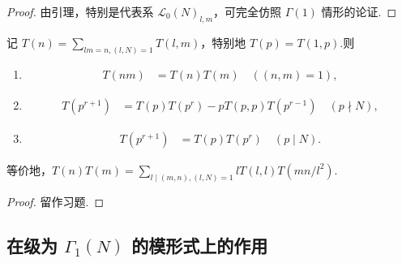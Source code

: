 \begin{proof}

由引理，特别是代表系 $\mathcal L_0(N)_{l,m}$，可完全仿照 $\Gamma(1)$ 情形的论证.

\end{proof}

\begin{corollary*}

记 $T(n)=\sum_{lm=n,(l,N)=1}T(l,m)$，特别地 $T(p)=T(1,p)$.则

\begin{enumerate}[label=\roman*)]
\item
\begin{align*}
T(nm)&=T(n)T(m)\quad((n,m)=1),
\end{align*}
\item
\begin{align*}
T(p^{r+1})&=T(p)T(p^r)-pT(p,p)T(p^{r-1})\quad(p\nmid N),
\end{align*}
\item
\begin{align*}
T(p^{r+1})&=T(p)T(p^r)\quad(p\mid N).
\end{align*}
\end{enumerate}

等价地，$T(n)T(m)=\sum_{l\mid(m,n),(l,N)=1}lT(l,l)T(mn/l^2)$.

\end{corollary*}

\begin{proof}留作习题.\end{proof}

\subsection{在级为 \texorpdfstring{$\Gamma_1(N)$}{Γ₁(N)} 的模形式上的作用}\label{sec:modular-1-3-5}

